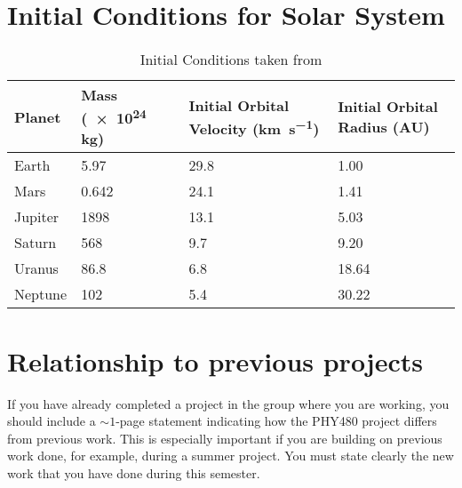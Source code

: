 \documentclass[a4paper,10pt]{article}
\begin{document}
\begin{appendix}

\section{Initial Conditions for Solar System}\label{cond}
\begin{table}[H]
\begin{tabular}{l|l|l|l}
Planet  & Mass (\num{e24} \si{\kilo\gram}) & Initial Orbital Velocity (\si{\kilo\metre\per\second}) & Initial Orbital Radius (AU) \\ \hline
Earth   & 5.97                                     & 29.8                                                & 1.00                        \\
Mars    & 0.642                                    & 24.1                                                & 1.41                        \\
Jupiter & 1898                                     & 13.1                                                & 5.03                        \\
Saturn  & 568                                      & 9.7                                                 & 9.20                        \\
Uranus  & 86.8                                     & 6.8                                                 & 18.64                       \\
Neptune & 102                                      & 5.4                                                 & 30.22                      
\end{tabular}
\caption{\label{InitConds}Initial Conditions taken from \cite{PlanetFacts}}
\end{table}

\section{Relationship to previous projects}
If you have already completed a project in the group where you are working, you should include a $\sim 1$-page statement indicating how the PHY480 project differs from previous work. This is especially important if you are building on previous work done, for example, during a summer project. You must state clearly the new work that you have done during this semester.

\end{appendix}
\end{document}
